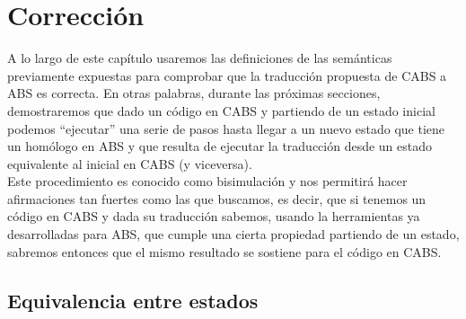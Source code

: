 \chapter{Corrección}

A lo largo de este capítulo usaremos las definiciones de las semánticas previamente expuestas para comprobar que la traducción propuesta de CABS a ABS es correcta. En otras palabras, durante las próximas secciones, demostraremos que dado un código en CABS y partiendo de un estado inicial podemos ``ejecutar'' una serie de pasos hasta llegar a un nuevo estado que tiene un homólogo en ABS y que resulta de ejecutar la traducción desde un estado equivalente al inicial en CABS (y viceversa).\\

Este procedimiento es conocido como bisimulación y nos permitirá hacer afirmaciones tan fuertes como las que buscamos, es decir, que si tenemos un código en CABS y dada su traducción sabemos, usando la herramientas ya desarrolladas para ABS, que cumple una cierta propiedad partiendo de un estado, sabremos entonces que el mismo resultado se sostiene para el código en CABS.

\section{Equivalencia entre estados}

